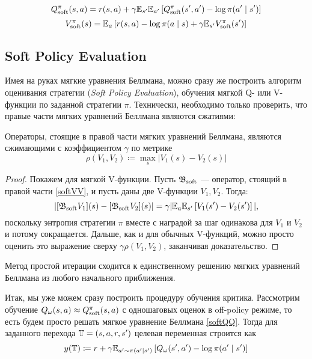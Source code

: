 \begin{theorem}
\begin{equation}\label{softQQ}
Q^\pi_{\mathrm{soft}}(s, a) = r(s, a) + \gamma \mathbb{E}_{s'} \mathbb{E}_{a'} \left[ Q^\pi_{\mathrm{soft}}(s', a') - \log \pi(a' \mid s') \right]
\end{equation}
\begin{equation}\label{softVV}
V^\pi_{\mathrm{soft}}(s) = \mathbb{E}_{a} \left[ r(s, a) - \log \pi(a \mid s) + \gamma \mathbb{E}_{s'} V^\pi_{\mathrm{soft}}(s') \right]
\end{equation}
\end{theorem}

\subsection{Soft Policy Evaluation}

Имея на руках мягкие уравнения Беллмана, можно сразу же построить алгоритм оценивания стратегии (\emph{Soft Policy Evaluation}), обучения мягкой Q- или V-функции по заданной стратегии $\pi$. Технически, необходимо только проверить, что правые части мягких уравнений Беллмана являются сжатиями:

\begin{theorem}
Операторы, стоящие в правой части мягких уравнений Беллмана, являются сжимающими с коэффициентом $\gamma$ по метрике
$$\rho(V_1, V_2) \coloneqq \max\limits_{s} | V_1(s) - V_2(s) |$$
\begin{proof}
Покажем для мягкой V-функции. Пусть $\mathfrak{B}_{\mathrm{soft}}$ --- оператор, стоящий в правой части \eqref{softVV}, и пусть даны две V-функции $V_1, V_2$.
Тогда:
$$
| [\mathfrak{B}_{\mathrm{soft}} V_1](s) - [\mathfrak{B}_{\mathrm{soft}} V_2](s) | = \gamma | \mathbb{E}_{a} \mathbb{E}_{s'} \left[ V_1(s') - V_2(s') \right] |,
$$
поскольку энтропия стратегии $\pi$ вместе с наградой за шаг одинакова для $V_1$ и $V_2$ и потому сокращается. Дальше, как и для обычных V-функций, можно просто оценить это выражение сверху $\gamma \rho(V_1, V_2)$, заканчивая доказательство.
\end{proof}
\end{theorem}

\begin{proposition}
Метод простой итерации сходится к единственному решению мягких уравнений Беллмана из любого начального приближения.
\end{proposition}

Итак, мы уже можем сразу построить процедуру обучения критика. Рассмотрим обучение $Q_\omega(s, a) \HM \approx Q^\pi_{\soft}(s, a)$ с одношаговых оценок в off-policy режиме, то есть будем просто решать мягкое уравнение Беллмана \eqref{softQQ}. Тогда для заданного перехода $\T \HM= (s, a, r, s')$ целевая переменная строится как
$$y(\mathbb{T}) \coloneqq r + \gamma \mathbb{E}_{a' \sim \pi(a' \mid s')} \left[ Q_\omega(s', a') - \log \pi(a' \mid s') \right]$$

